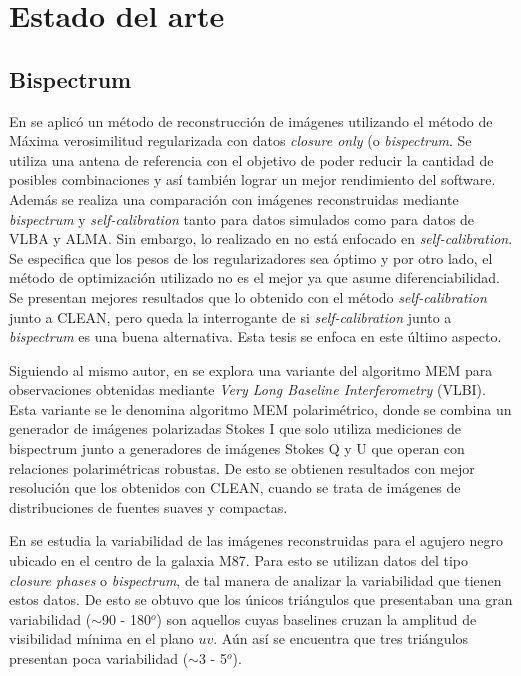 \chapter{Estado del arte}
\label{cap:estado}

\section{Bispectrum}

En \citet{Chael_2018} se aplicó un método de reconstrucción de imágenes utilizando el método de Máxima verosimilitud regularizada con datos \textit{closure only} (o \textit{bispectrum}. Se utiliza una antena de referencia con el objetivo de poder reducir la cantidad de posibles combinaciones y así también lograr un mejor rendimiento del software. Además se realiza una comparación con imágenes reconstruidas mediante \textit{bispectrum} y \textit{self-calibration} tanto para datos simulados como para datos de VLBA y ALMA. Sin embargo, lo realizado en \citet{Chael_2018} no está enfocado en \textit{self-calibration}. Se especifica que los pesos de los regularizadores sea óptimo y por otro lado, el método de optimización utilizado no es el mejor ya que asume diferenciabilidad. Se presentan mejores resultados que lo obtenido con el método \textit{self-calibration} junto a CLEAN, pero queda la interrogante de si \textit{self-calibration} junto a \textit{bispectrum} es una buena alternativa. Esta tesis se enfoca en este último aspecto.

Siguiendo al mismo autor, en \citet{event_horizon} se explora una variante del algoritmo MEM para observaciones obtenidas mediante \textit{Very Long Baseline Interferometry} (VLBI). Esta variante se le denomina algoritmo MEM polarimétrico, donde se combina un generador de imágenes polarizadas Stokes I que solo utiliza mediciones de bispectrum junto a generadores de imágenes Stokes Q y U que operan con relaciones polarimétricas robustas. De esto se obtienen resultados con mejor resolución que los obtenidos con CLEAN, cuando se trata de imágenes de distribuciones de fuentes suaves y compactas. 

En \citet{m87} se estudia la variabilidad de las imágenes reconstruidas para el agujero negro ubicado en el centro de la galaxia M87. Para esto se utilizan datos del tipo \textit{closure phases} o \textit{bispectrum}, de tal manera de analizar la variabilidad que tienen estos datos. De esto se obtuvo que los únicos triángulos que presentaban una gran variabilidad ($\sim$90 - 180$^o$) son aquellos cuyas baselines cruzan la amplitud de visibilidad mínima en el plano $uv$. Aún así se encuentra que tres triángulos presentan poca variabilidad ($\sim$3 - 5$^o$). 

